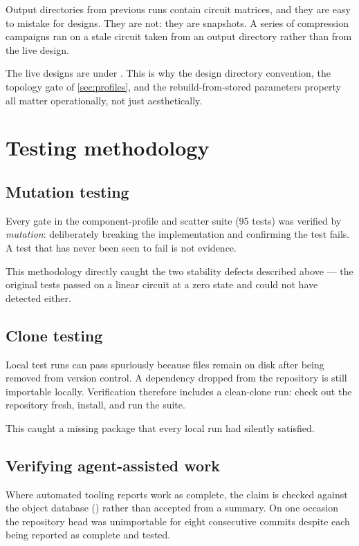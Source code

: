 \begin{caveat}
Output directories from previous runs contain circuit matrices, and they are
easy to mistake for designs. They are not: they are snapshots. A series of
compression campaigns ran on a stale circuit taken from an output directory
rather than from the live design.

The live designs are under . This is why the design directory
convention, the topology gate of \cref{sec:profiles}, and the rebuild-from-stored
parameters property all matter operationally, not just aesthetically.
\end{caveat}

\section{Testing methodology}

\subsection{Mutation testing}

Every gate in the component-profile and scatter suite (95 tests) was verified by
\emph{mutation}: deliberately breaking the implementation and confirming the test
fails. A test that has never been seen to fail is not evidence.

This methodology directly caught the two stability defects described above ---
the original tests passed on a linear circuit at a zero state and could not have
detected either.

\subsection{Clone testing}

Local test runs can pass spuriously because files remain on disk after being
removed from version control. A dependency dropped from the repository is still
importable locally. Verification therefore includes a clean-clone run: check out
the repository fresh, install, and run the suite.

This caught a missing package that every local run had silently satisfied.

\subsection{Verifying agent-assisted work}

Where automated tooling reports work as complete, the claim is checked against
the object database () rather than accepted from a summary. On
one occasion the repository head was unimportable for eight consecutive commits
despite each being reported as complete and tested.

